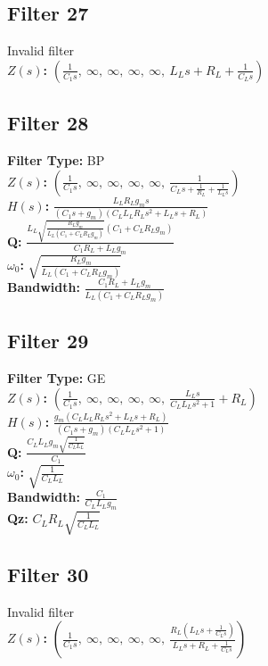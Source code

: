\documentclass{article}
\begin{document}
\subsection*{Filter 27}
Invalid filter \\ 
\textbf{$Z(s)$:} $\left( \frac{1}{C_{1} s}, \  \infty, \  \infty, \  \infty, \  \infty, \  L_{L} s + R_{L} + \frac{1}{C_{L} s}\right)$ \\ 
\subsection*{Filter 28}
\textbf{Filter Type:} BP \\ 
\textbf{$Z(s)$:} $\left( \frac{1}{C_{1} s}, \  \infty, \  \infty, \  \infty, \  \infty, \  \frac{1}{C_{L} s + \frac{1}{R_{L}} + \frac{1}{L_{L} s}}\right)$ \\ 
\textbf{$H(s)$:} $\frac{L_{L} R_{L} g_{m} s}{\left(C_{1} s + g_{m}\right) \left(C_{L} L_{L} R_{L} s^{2} + L_{L} s + R_{L}\right)}$ \\ 
\textbf{Q:} $\frac{L_{L} \sqrt{\frac{R_{L} g_{m}}{L_{L} \left(C_{1} + C_{L} R_{L} g_{m}\right)}} \left(C_{1} + C_{L} R_{L} g_{m}\right)}{C_{1} R_{L} + L_{L} g_{m}}$ \\ 
\textbf{$\omega_0$:} $\sqrt{\frac{R_{L} g_{m}}{L_{L} \left(C_{1} + C_{L} R_{L} g_{m}\right)}}$ \\ 
\textbf{Bandwidth:} $\frac{C_{1} R_{L} + L_{L} g_{m}}{L_{L} \left(C_{1} + C_{L} R_{L} g_{m}\right)}$ \\ 
\subsection*{Filter 29}
\textbf{Filter Type:} GE \\ 
\textbf{$Z(s)$:} $\left( \frac{1}{C_{1} s}, \  \infty, \  \infty, \  \infty, \  \infty, \  \frac{L_{L} s}{C_{L} L_{L} s^{2} + 1} + R_{L}\right)$ \\ 
\textbf{$H(s)$:} $\frac{g_{m} \left(C_{L} L_{L} R_{L} s^{2} + L_{L} s + R_{L}\right)}{\left(C_{1} s + g_{m}\right) \left(C_{L} L_{L} s^{2} + 1\right)}$ \\ 
\textbf{Q:} $\frac{C_{L} L_{L} g_{m} \sqrt{\frac{1}{C_{L} L_{L}}}}{C_{1}}$ \\ 
\textbf{$\omega_0$:} $\sqrt{\frac{1}{C_{L} L_{L}}}$ \\ 
\textbf{Bandwidth:} $\frac{C_{1}}{C_{L} L_{L} g_{m}}$ \\ 
\textbf{Qz:} $C_{L} R_{L} \sqrt{\frac{1}{C_{L} L_{L}}}$ \\ 
\subsection*{Filter 30}
Invalid filter \\ 
\textbf{$Z(s)$:} $\left( \frac{1}{C_{1} s}, \  \infty, \  \infty, \  \infty, \  \infty, \  \frac{R_{L} \left(L_{L} s + \frac{1}{C_{L} s}\right)}{L_{L} s + R_{L} + \frac{1}{C_{L} s}}\right)$ \\ 
\end{document}
